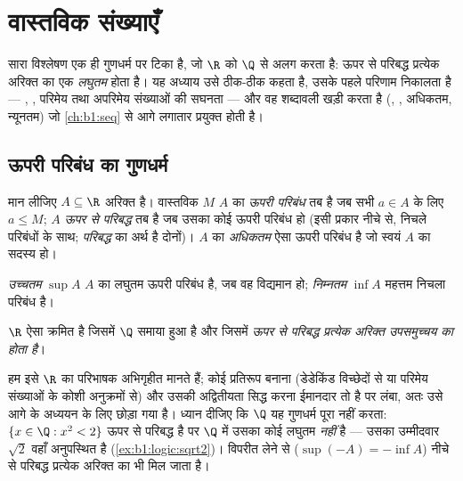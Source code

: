 \chapter{वास्तविक संख्याएँ}\label{ch:b1:reals}

सारा विश्लेषण एक ही गुणधर्म पर टिका है, जो $\R$ को $\Q$ से अलग करता है: ऊपर
से परिबद्ध प्रत्येक अरिक्त  का एक \emph{लघुतम}  होता है।
यह अध्याय उसे ठीक-ठीक कहता है, उसके पहले परिणाम निकालता है --- , , परिमेय तथा अपरिमेय संख्याओं की सघनता --- और वह शब्दावली
खड़ी करता है (, , अधिकतम, न्यूनतम) जो \cref{ch:b1:seq} से आगे
लगातार प्रयुक्त होती है।

\section{ऊपरी परिबंध का गुणधर्म}

\begin{definition}\label{def:b1:reals:bounds}
मान लीजिए $A \subseteq \R$ अरिक्त है। वास्तविक $M$ $A$ का \emph{ऊपरी
परिबंध} तब है जब सभी $a \in A$ के लिए $a \leq M$; $A$
\emph{ऊपर से परिबद्ध} तब है जब उसका कोई ऊपरी परिबंध हो (इसी प्रकार नीचे से,
निचले परिबंधों के साथ; \emph{परिबद्ध} का अर्थ है दोनों)। $A$ का
\emph{अधिकतम} ऐसा ऊपरी परिबंध है जो स्वयं $A$ का सदस्य हो।

\emph{उच्चतम} $\sup A$ $A$ का लघुतम ऊपरी परिबंध है, जब वह
विद्यमान हो; \emph{निम्नतम} $\inf A$ महत्तम निचला परिबंध है।
\end{definition}

\begin{theorem}[$\R$ का पूर्णता अभिगृहीत]\label{thm:b1:reals:sup}
$\R$ ऐसा क्रमित  है जिसमें $\Q$ समाया हुआ है और जिसमें \emph{ऊपर से
परिबद्ध प्रत्येक अरिक्त उपसमुच्चय का  होता है}।
\end{theorem}
\admitted

\begin{remark}
हम इसे $\R$ का परिभाषक अभिगृहीत मानते हैं; कोई प्रतिरूप बनाना (डेडेकिंड
विच्छेदों से या परिमेय संख्याओं के कोशी अनुक्रमों से) और उसकी अद्वितीयता
सिद्ध करना ईमानदार तो है पर लंबा, अतः उसे आगे के अध्ययन के लिए छोड़ा गया है।
ध्यान दीजिए कि $\Q$ यह गुणधर्म पूरा नहीं करता: $\{x \in \Q : x^2 < 2\}$ ऊपर
से परिबद्ध है पर $\Q$ में उसका कोई लघुतम  \emph{नहीं} है --- उसका
उम्मीदवार $\sqrt 2$ वहाँ अनुपस्थित है (\cref{ex:b1:logic:sqrt2})। विपरीत
लेने से ($\sup(-A) = -\inf A$) नीचे से परिबद्ध प्रत्येक अरिक्त  का
 भी मिल जाता है।
\end{remark}

